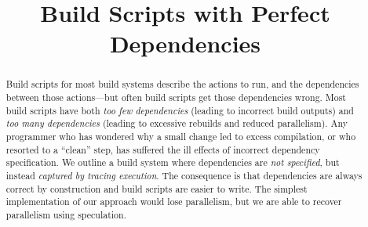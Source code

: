 \documentclass[acmsmall,screen,review,anonymous,10pt]{acmart}
\begin{document}
\newcommand{\Make}{\textsc{Make}\xspace}
\newcommand{\Rattle}{\textsc{Rattle}\xspace}
\newcommand{\Fabricate}{\textsc{Fabricate}\xspace}
\newcommand{\Bazel}{\textsc{Bazel}\xspace}
\newcommand{\Buck}{\textsc{Buck}\xspace}
\newcommand{\Shake}{\textsc{Shake}\xspace}
\newcommand{\Bigbro}{\textsc{BigBro}\xspace}
\newcommand{\Fac}{\textsc{Fac}\xspace}
\newcommand{\Fsatrace}{\textsc{Fsatrace}\xspace}
\newcommand{\tracedfs}{\textsc{Traced-Fs}\xspace}
\newcommand{\BuildXL}{\textsc{BuildXL}\xspace}
\newcommand{\Nix}{\textsc{Nix}\xspace}
\newcommand{\Memoize}{\textsc{Memoize}\xspace}
\newcommand{\Stroll}{\textsc{Stroll}\xspace}

\newcommand{\postparagraphs}{\vspace{3mm}\noindent}


\title{Build Scripts with Perfect Dependencies}



\begin{abstract}
Build scripts for most build systems describe the actions to run, and the dependencies between those actions---but often build scripts get those dependencies wrong.
Most build scripts have both \emph{too few dependencies} (leading to incorrect build outputs) and \emph{too many dependencies} (leading to excessive rebuilds and reduced parallelism). Any programmer who has wondered why a small change led to excess compilation, or who resorted to a ``clean'' step, has suffered the ill effects of incorrect dependency specification.
We outline a build system where dependencies are \emph{not specified}, but instead \emph{captured by tracing execution}.
The consequence is that dependencies are always correct by construction and build scripts are easier to write.
The simplest implementation of our approach would lose parallelism, but we are able to recover parallelism using speculation.
\end{abstract}


\maketitle











\end{document}
